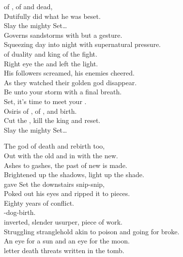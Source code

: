  of , of  and dead, \\
Dutifully did what he was beset. \\

Slay the mighty Set… \\

Governs sandstorms with but a gesture. \\
Squeezing day into night with supernatural pressure. \\
 of duality and king of the fight. \\
Right eye the  and left the  light. \\

His followers screamed, his enemies cheered. \\
As they watched their golden god disappear. \\
Be unto your storm with a final breath. \\
Set, it's time to meet your . \\

Osiris of , of , and birth. \\
Cut the , kill the king and reset. \\

Slay the mighty Set… \\


The god of death and rebirth too, \\
Out with the old and in with the new. \\
Ashes to gashes, the past of new  is made. \\
Brightened up the shadows, light up the shade. \\
 gave Set the downstairs snip-snip, \\
Poked out his eyes and ripped it to pieces. \\
Eighty years of conflict. \\

-dog-birth. \\
 inverted, slender usurper, piece of work. \\
Struggling stranglehold akin to poison and going for broke. \\
An eye for a sun and an eye for the moon. \\
 letter death threats written in the tomb. \\

